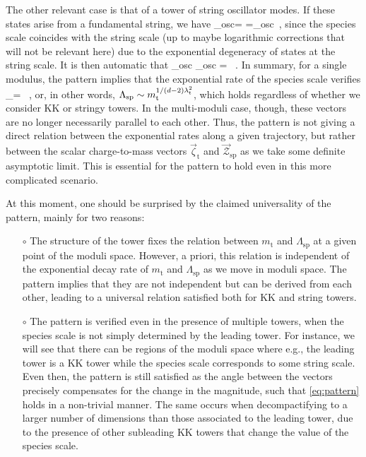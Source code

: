 The other relevant case is that of a tower of string oscillator modes. If these states arise from a fundamental string, we have
%
\beq\label{eq:zeta&speciesvecstring}
	\zeta_{\rm osc}= =_{\rm osc}\, ,
\eeq
%
since the species scale coincides with the string scale (up to maybe logarithmic corrections that will not be relevant here) due to the exponential degeneracy of states at the string scale. It is then automatic that 
%
\beq\label{eq:patternstringsinglemodulus}
	\zeta_{\rm osc} \cdot {}_{\rm osc} = \, .
\eeq
%
In summary, for a single modulus, the pattern implies that the exponential rate of the species scale verifies
%
\beq
	\lambda_{}= \, ,
\eeq
%
or, in other words, $\Lambda_{\text{sp}}\sim m_{\rm t}^{1/(d-2)\lambda_{\text{t}}^2 }$, which holds regardless of whether we consider KK or stringy towers. In the multi-moduli case, though, these vectors are no longer necessarily parallel to each other. Thus, the pattern is not giving a direct relation between the exponential rates along a given trajectory, but rather between the scalar charge-to-mass vectors $\vec\zeta_{\text{t}}$ and $\vec{\mathcal{Z}}_{\text{sp}}$ as we take some definite asymptotic limit. This is essential for the pattern to hold even in this more complicated scenario.
	
At this moment, one should be surprised by the claimed universality of the pattern, mainly for two reasons:
\begin{itemize}
	\item[$\circ$] The structure of the tower fixes the relation between $m_{\text{t}}$ and $\Lambda_{\text{sp}}$ at a given point of the moduli space. However, a priori, this relation is independent of the exponential decay rate of $m_{\text{t}}$ and $\Lambda_{\text{sp}}$ as we move in moduli space. The pattern implies that they are not independent but can be derived from each other, leading to a universal relation satisfied both for KK and string towers.
	\item[$\circ$] The pattern is verified even in the presence of multiple towers, when the species scale is not simply determined by the leading tower. For instance, we will see that there can be regions of the moduli space where e.g., the leading tower is a KK tower while the species scale corresponds to some string scale. Even then, the pattern is still satisfied as the angle between the vectors precisely compensates for the change in the magnitude, such that \eqref{eq:pattern} holds in a non-trivial manner. The same occurs when decompactifying to a larger number of dimensions than those associated to the leading tower, due to the presence of other subleading KK towers that change the value of the species scale.
\end{itemize}
	
